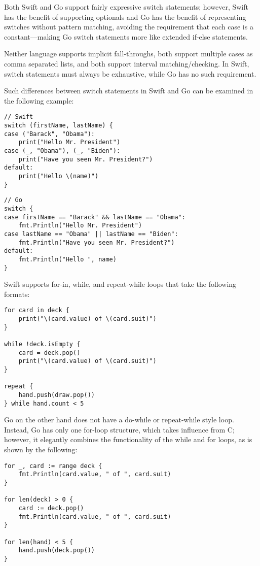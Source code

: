 \documentclass[letterpaper]{article}
\begin{document}
Both Swift and Go support fairly expressive switch statements; however, Swift has the benefit of supporting optionals and Go has the benefit of representing switches without pattern matching, avoiding the requirement that each case is a constant—making Go switch statements more like extended if-else statements.

Neither language supports implicit fall-throughs, both support multiple cases as comma separated lists, and both support interval matching/checking. In Swift, switch statements must always be exhaustive, while Go has no such requirement.

Such differences between switch statements in Swift and Go can be examined in the following example:

\begin{verbatim}
// Swift
switch (firstName, lastName) {
case ("Barack", "Obama"):
    print("Hello Mr. President")
case (_, "Obama"), (_, "Biden"):
    print("Have you seen Mr. President?")
default:
    print("Hello \(name)")
}
\end{verbatim}

\begin{verbatim}
// Go
switch {
case firstName == "Barack" && lastName == "Obama":
    fmt.Println("Hello Mr. President")
case lastName == "Obama" || lastName == "Biden":
    fmt.Println("Have you seen Mr. President?")
default:
    fmt.Println("Hello ", name)
}
\end{verbatim}

Swift supports for-in, while, and repeat-while loops that take the following formats:

\begin{verbatim}
for card in deck {
    print("\(card.value) of \(card.suit)")
}

while !deck.isEmpty {
    card = deck.pop()
    print("\(card.value) of \(card.suit)")
}

repeat {
    hand.push(draw.pop())
} while hand.count < 5
\end{verbatim}

Go on the other hand does not have a do-while or repeat-while style loop. Instead, Go has only one for-loop structure, which takes influence from C; however, it elegantly combines the functionality of the while and for loops, as is shown by the following:

\begin{verbatim}
for _, card := range deck {
    fmt.Println(card.value, " of ", card.suit)
}

for len(deck) > 0 {
    card := deck.pop()
    fmt.Println(card.value, " of ", card.suit)
}

for len(hand) < 5 {
    hand.push(deck.pop())
}
\end{verbatim}
\end{document}
